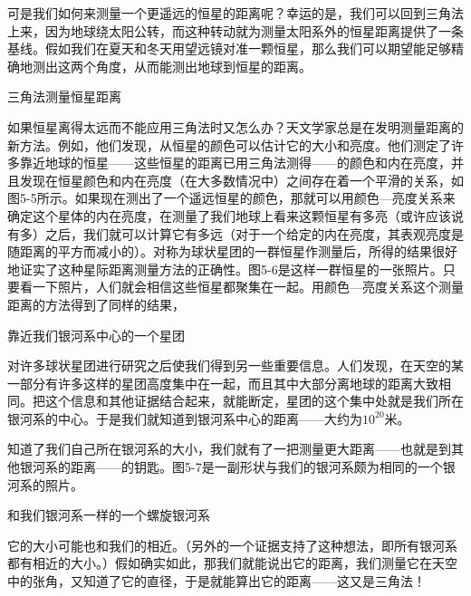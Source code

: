 \documentclass[12pt,oneside]{book}
\begin{document}
\begin{common-format}
可是我们如何来测量一个更遥远的恒星的距离呢？幸运的是，我们可以回到三角法上来，因为地球绕太阳公转，而这种转动就为测量太阳系外的恒星距离提供了一条基线。假如我们在夏天和冬天用望远镜对准一颗恒星，那么我们可以期望能足够精确地测出这两个角度，从而能测出地球到恒星的距离。
\begin{fig}{三角法测量恒星距离}
\caption{\footnotesize 利用地球轨道的直径作为基线，可以用三角法测量靠近地球的恒星的距离}
\label{fig:三角法测量恒星距离}
\end{fig}

如果恒星离得太远而不能应用三角法时又怎么办？天文学家总是在发明测量距离的新方法。例如，他们发现，从恒星的颜色可以估计它的大小和亮度。他们测定了许多靠近地球的恒星——这些恒星的距离已用三角法测得——的颜色和内在亮度，并且发现在恒星颜色和内在亮度（在大多数情况中）之间存在着一个平滑的关系，如图5-5所示。如果现在测出了一个遥远恒星的颜色，那就可以用颜色—亮度关系来确定这个星体的内在亮度，在测量了我们地球上看来这颗恒星有多亮（或许应该说有多）之后，我们就可以计算它有多远（对于一个给定的内在亮度，其表观亮度是随距离的平方而减小的）。对称为球状星团的一群恒星作测量后，所得的结果很好地证实了这种星际距离测量方法的正确性。图5-6是这样一群恒星的一张照片。只要看一下照片，人们就会相信这些恒星都聚集在一起。用颜色—亮度关系这个测量距离的方法得到了同样的结果，
\begin{fig}[2.5]{靠近我们银河系中心的一个星团}
\caption{\footnotesize 靠近我们银河系中心的一个星团，其中各恒星与地球的距离为30,000光年，或约$ 3\times 10^{20} $米}
\label{fig:靠近我们银河系中心的一个星团}
\end{fig}

对许多球状星团进行研究之后使我们得到另一些重要信息。人们发现，在天空的某一部分有许多这样的星团高度集中在一起，而且其中大部分离地球的距离大致相同。把这个信息和其他证据结合起来，就能断定，星团的这个集中处就是我们所在银河系的中心。于是我们就知道到银河系中心的距离——大约为$ 10^{20} $米。

知道了我们自己所在银河系的大小，我们就有了一把测量更大距离——也就是到其他银河系的距离——的钥匙。图5-7是一副形状与我们的银河系颇为相同的一个银河系的照片。
\begin{fig}[2.5]{和我们银河系一样的一个螺旋银河系}
\caption{\footnotesize 和我们银河系一样的一个螺旋银河系，假定它的直径与我们银河系相近，那么我们从它的表观大小就能算出它的距离。它离地球约3000万光年（即$ 3\times 10^{23} $米）}
\label{fig:和我们银河系一样的一个螺旋银河系}
\end{fig}
它的大小可能也和我们的相近。（另外的一个证据支持了这种想法，即所有银河系都有相近的大小。）假如确实如此，那我们就能说出它的距离，我们测量它在天空中的张角，又知道了它的直径，于是就能算出它的距离——这又是三角法！


\end{common-format}
\end{document}
